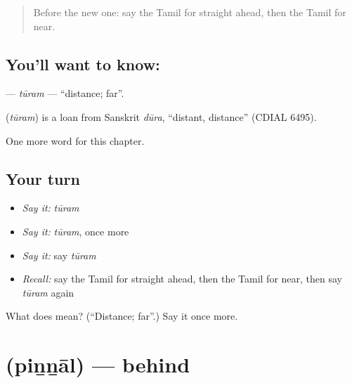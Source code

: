 \label{lesson:TA-C113-turam}



\begin{quote}
Before the new one: say the Tamil for straight ahead, then the Tamil for near.
\end{quote}

\subsection*{You'll want to know: }
\textbf{} — \emph{tūram} — \textquotedblleft{}distance; far\textquotedblright{}.

\begin{cousinweb}
\textbf{} (\emph{tūram}) is a loan from Sanskrit \emph{dūra}, \textquotedblleft{}distant, distance\textquotedblright{} (CDIAL 6495).
\end{cousinweb}

\begin{grammarlens}[title={What you've built}]
One more word for this chapter.
\end{grammarlens}

\subsection*{Your turn}
\begin{itemize}
\raggedright
  \item \emph{Say it:} \emph{tūram}
  \item \emph{Say it:} \emph{tūram}, once more
  \item \emph{Say it:} say \emph{tūram}
  \item \emph{Recall:} say the Tamil for straight ahead, then the Tamil for near, then say \emph{tūram} again
\end{itemize}

\begin{tcolorbox}[breakable,colback=teal!4,colframe=teal!35!black,title={Before you move on}]
What does  mean? (\textquotedblleft{}Distance; far\textquotedblright{}.) Say it once more.
\end{tcolorbox}
\section[\texorpdfstring{\ta{பின்னால்} (piṉṉāl)}{பின்னால் (piṉṉāl)}]{ (piṉṉāl) — behind}

\label{lesson:TA-C113-pinnal}



